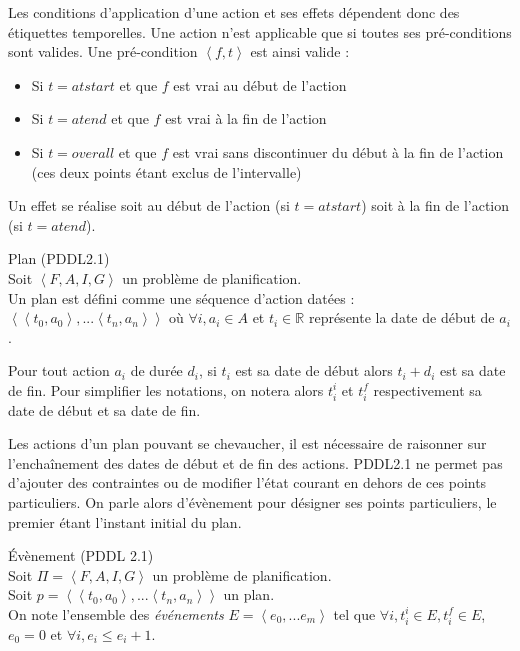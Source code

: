 Les conditions d'application d'une action et ses effets dépendent donc des étiquettes temporelles.
Une action n'est applicable que si toutes ses pré-conditions sont valides.
Une pré-condition $\left< f, t \right>$ est ainsi valide :
\begin{itemize}
	\item Si $t = atstart$ et que $f$ est vrai au début de l'action
	\item Si $t = atend$ et que $f$ est vrai à la fin de l'action
	\item Si $t = overall$ et que $f$ est vrai sans discontinuer du début à la fin de l'action (ces deux points étant exclus de l'intervalle)
\end{itemize}
Un effet se réalise soit au début de l'action (si $t = atstart$) soit à la fin de l'action (si $t = atend$).

\begin{definition}Plan (PDDL2.1)\\
	Soit $\left<F,A,I,G\right>$ un problème de planification.\\
	Un plan est défini comme une séquence d'action datées : $\left< \left< t_0, a_0 \right>, ... \left< t_n, a_n \right> \right>$ où $\forall i, a_i \in A$ et $t_i \in \mathbb{R}$ représente la date de début de $a_i$.
\end{definition}

Pour tout action $a_i$ de durée $d_i$, si $t_i$ est sa date de début alors $t_i + d_i$ est sa date de fin. Pour simplifier les notations, on notera alors $t^i_i$ et $t^f_i$ respectivement sa date de début et sa date de fin. 

Les actions d'un plan pouvant se chevaucher, il est nécessaire de raisonner sur l'enchaînement des dates de début et de fin des actions. 
PDDL2.1 ne permet pas d'ajouter des contraintes ou de modifier l'état courant en dehors de ces points particuliers.
On parle alors d'évènement pour désigner ses points particuliers, le premier étant l'instant initial du plan.

\begin{definition}Évènement (PDDL 2.1)\\
	Soit $\Pi = \left<F,A,I,G\right>$ un problème de planification. \\
	Soit $p = \left< \left< t_0, a_0 \right>, ... \left< t_n, a_n \right> \right>$ un plan.\\
	On note l'ensemble des \emph{événements} $E = \left< e_0, ... e_m\right>$ tel que $\forall i, t^i_i \in E, t^f_i \in E$, $e_0 = 0$ et $\forall i, e_i \leq e_i+1$.
\end{definition}

